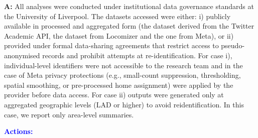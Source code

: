 \documentclass[
  letterpaper,
  DIV=11,
  numbers=noendperiod]{scrartcl}
\begin{document}
\setlength{\leftskip}{0.5cm}\textbf{A:} All analyses were conducted
under institutional data governance standards at the University of
Liverpool. The datasets accessed were either: i) publicly available in
processed and aggregated form (the dataset derived from the Twitter
Academic API, the dataset from Locomizer and the one from Meta), or ii)
provided under formal data-sharing agreements that restrict access to
pseudo-anonymised records and prohibit attempts at re-identification.
For case i), individual-level identifiers were not accessible to the
research team and in the case of Meta privacy protections (e.g.,
small-count suppression, thresholding, spatial smoothing, or
pre-processed home assignment) were applied by the provider before data
access. For case ii) outputs were generated only at aggregated
geographic levels (LAD or higher) to avoid reidentification. In this
case, we report only area-level summaries.

\setlength{\leftskip}{0.5cm}\textcolor{blue}{\textbf{Actions:}}
\vspace{-3mm}
\end{document}
